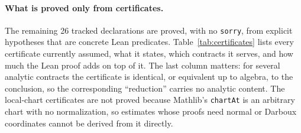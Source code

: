 \documentclass[11pt]{article}
\renewcommand{\_}{\origus\allowbreak}
\newcommand{\code}[1]{\texttt{#1}}
\begin{document}
\paragraph{What is proved only from certificates.}
The remaining 26 tracked declarations are proved, with no \code{sorry}, from explicit hypotheses
that are concrete Lean predicates. Table~\ref{tab:certificates} lists every certificate currently
assumed, what it states, which contracts it serves, and how much the Lean proof adds on top of it.
The last column matters: for several analytic contracts the certificate is identical, or equivalent
up to algebra, to the conclusion, so the corresponding ``reduction'' carries no analytic content.
The local-chart certificates are not proved because Mathlib's \code{chartAt} is an arbitrary chart
with no normalization, so estimates whose proofs need normal or Darboux coordinates cannot be derived
from it directly.
\end{document}
